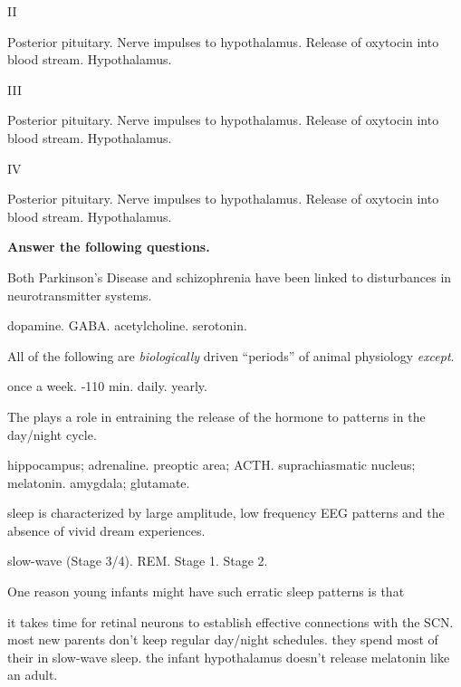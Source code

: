 \documentclass[answers]{exam}
\begin{document}
\begin{questions}
\question II
\begin{choices}
\choice Posterior pituitary.
\choice Nerve impulses to hypothalamus.
\choice Release of oxytocin into blood stream.
\correctchoice Hypothalamus.
\end{choices}

\question III
\begin{choices}
\correctchoice Posterior pituitary.
\choice Nerve impulses to hypothalamus.
\choice Release of oxytocin into blood stream.
\choice Hypothalamus.
\end{choices}

\question IV
\begin{choices}
\choice Posterior pituitary.
\choice Nerve impulses to hypothalamus.
\correctchoice Release of oxytocin into blood stream.
\choice Hypothalamus.
\end{choices}

\newpage

\textbf{Answer the following questions.}

\question Both Parkinson's Disease and schizophrenia have been linked to disturbances in \fillin neurotransmitter systems.
\begin{choices}
\correctchoice  dopamine.
\choice  GABA.
\choice  acetylcholine.
\choice  serotonin.
\end{choices}

\question All of the following are \emph{biologically} driven ``periods'' of animal physiology \emph{except}.
\begin{choices}
\correctchoice once a week.
-110 min.
\choice daily.
\choice yearly.
\end{choices}

\question The \fillin plays a role in entraining the release of the hormone \fillin to patterns in the day/night cycle.
\begin{choices}
\choice hippocampus; adrenaline.
\choice preoptic area; ACTH.
\correctchoice suprachiasmatic nucleus; melatonin.
\choice amygdala; glutamate.
\end{choices}

\question \fillin sleep is characterized by large amplitude, low frequency EEG patterns and the absence of vivid dream experiences.
\begin{choices}
\correctchoice slow-wave (Stage 3/4).
\choice REM.
\choice Stage 1.
\choice Stage 2.
\end{choices}

\question One reason young infants might have such erratic sleep patterns is that
\begin{choices}
\correctchoice it takes time for retinal neurons to establish effective connections with the SCN.
\choice most new parents don't keep regular day/night schedules.
\choice they spend most of their in slow-wave sleep.
\choice the infant hypothalamus doesn't release melatonin like an adult.
\end{choices}


\end{questions}
\end{document}
